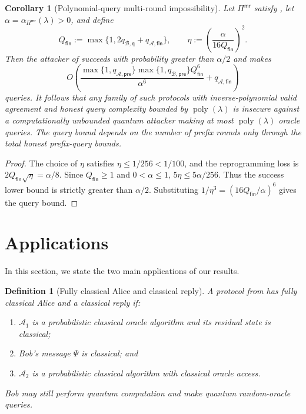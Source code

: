 \documentclass[11pt]{article}
\newcounter{algorithm}
\newtheorem{corollary}[corollary]{Corollary}
\newtheorem{definition}[definition]{Definition}
\newcommand{\cA}{\mathcal{A}}
\newcommand{\cB}{\mathcal{B}}
\newcommand{\poly}{\operatorname{poly}}
\begin{document}
\begin{corollary}[Polynomial-query multi-round impossibility]
\label{cor:multi-impossibility}
Let \(\Pi^{\mathsf{mr}}\) satisfy , let
\(\alpha=\alpha_{\Pi^{\mathsf{mr}}}(\lambda)>0\), and define
\[
  Q_{\mathsf{fin}}
  :=
  \max\{1,2q_{\cB,\mathsf q}+q_{\cA,\mathsf{fin}}\},
  \qquad
  \eta
  :=
  \left(\frac{\alpha}{16Q_{\mathsf{fin}}}\right)^2.
\]
Then the attacker of  succeeds with probability greater
than \(\alpha/2\) and makes
\[
  O\!\left(
    \frac{
      \max\{1,q_{\cA,\mathsf{pre}}\}
      \max\{1,q_{\cB,\mathsf{pre}}\}
      Q_{\mathsf{fin}}^6}
      {\alpha^6}
    +q_{\cA,\mathsf{fin}}
  \right)
\]
queries. It follows that any family of such protocols with
inverse-polynomial valid agreement and honest query complexity bounded by
\(\poly(\lambda)\) is insecure against a computationally unbounded quantum
attacker making at most \(\poly(\lambda)\) oracle queries.
The query bound depends on the number of prefix rounds only through the total
honest prefix-query bounds.
\end{corollary}

\begin{proof}
The choice of \(\eta\) satisfies \(\eta\le1/256<1/100\), and the
reprogramming loss is
\(2Q_{\mathsf{fin}}\sqrt\eta=\alpha/8\).  Since
\(Q_{\mathsf{fin}}\ge1\) and \(0<\alpha\le1\),
\(5\eta\le5\alpha/256\).  Thus the success lower bound is strictly greater
than \(\alpha/2\).  Substituting
\(1/\eta^3=(16Q_{\mathsf{fin}}/\alpha)^6\) gives the query bound.
\end{proof}

\section{Applications}\label{sec:corollaries}

In this section, we state the two main applications of our results.


\begin{definition}[Fully classical Alice and classical reply]
A protocol from  has fully classical Alice and a classical
reply if:
\begin{enumerate}[leftmargin=2em]
  \item \(\cA_1\) is a probabilistic classical oracle algorithm and its
  residual state is classical;
  \item Bob's message \(\Psi\) is classical; and
  \item \(\cA_2\) is a probabilistic classical algorithm with classical
  oracle access.
\end{enumerate}
Bob may still perform quantum computation and make quantum random-oracle
queries.
\end{definition}
\end{document}
